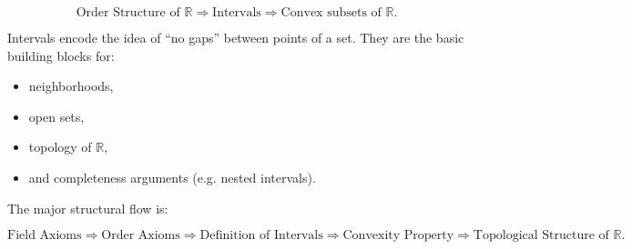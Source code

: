 \begin{exposition}
\[
\text{Order Structure of }\mathbb{R}
\Rightarrow
\text{Intervals}
\Rightarrow
\text{Convex subsets of }\mathbb{R}.
\]
\end{exposition}

\begin{exposition}
Intervals encode the idea of “no gaps” between points of a set.
They are the basic building blocks for:
\end{exposition}

\begin{itemize}
\item neighborhoods,
\item open sets,
\item topology of $\mathbb{R}$,
\item and completeness arguments (e.g. nested intervals).
\end{itemize}

\begin{remark*}
The major structural flow is:

\[
\text{Field Axioms}
\Rightarrow
\text{Order Axioms}
\Rightarrow
\text{Definition of Intervals}
\Rightarrow
\text{Convexity Property}
\Rightarrow
\text{Topological Structure of }\mathbb{R}.
\]
\end{remark*}
